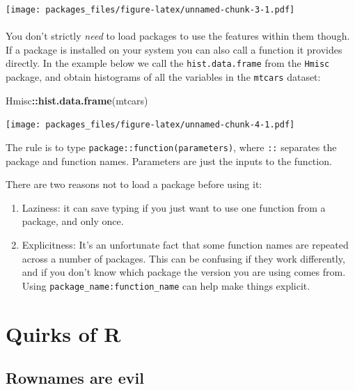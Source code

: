 \documentclass[]{article}
\newenvironment{Shaded}{\begin{snugshade}}{\end{snugshade}}
\newcommand{\KeywordTok}[1]{\textcolor[rgb]{0.13,0.29,0.53}{\textbf{#1}}}
\newcommand{\OperatorTok}[1]{\textcolor[rgb]{0.81,0.36,0.00}{\textbf{#1}}}
\newcommand{\NormalTok}[1]{#1}
\let\oldparagraph\paragraph
\renewcommand{\paragraph}[1]{\oldparagraph{#1}\mbox{}}
\theoremstyle{definition}
\theoremstyle{definition}
\theoremstyle{definition}
\theoremstyle{remark}
\begin{document}
\texttt{[image: packages\_files/figure-latex/unnamed-chunk-3-1.pdf]}

\hypertarget{package-namespacing}{\paragraph{}\label{package-namespacing}}

You don't strictly \emph{need} to load packages to use the features
within them though. If a package is installed on your system you can
also call a function it provides directly. In the example below we call
the \texttt{hist.data.frame} from the \texttt{Hmisc} package, and obtain
histograms of all the variables in the \texttt{mtcars} dataset:

\begin{Shaded}
\begin{Highlighting}[]
\NormalTok{Hmisc}\OperatorTok{::}\KeywordTok{hist.data.frame}\NormalTok{(mtcars)}
\end{Highlighting}
\end{Shaded}

\texttt{[image: packages\_files/figure-latex/unnamed-chunk-4-1.pdf]}

The rule is to type \texttt{package::function(parameters)}, where
\texttt{::} separates the package and function names. Parameters are
just the inputs to the function.

There are two reasons not to load a package before using it:

\begin{enumerate}
\def\labelenumi{\arabic{enumi}.}
\item
  Laziness: it can save typing if you just want to use one function from
  a package, and only once.
\item
  Explicitness: It's an unfortunate fact that some function names are
  repeated across a number of packages. This can be confusing if they
  work differently, and if you don't know which package the version you
  are using comes from. Using \texttt{package\_name:function\_name} can
  help make things explicit.
\end{enumerate}

\section{Quirks of R}\label{quirks}

\hypertarget{rownames}{\subsection*{Rownames are evil}\label{rownames}}
\end{document}
